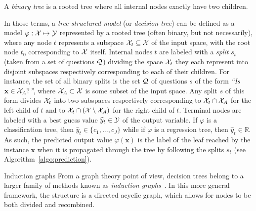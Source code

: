\begin{definition}
A \emph{binary tree} is a rooted tree where all internal nodes exactly
have two children.
\end{definition}

In those terms, a \textit{tree-structured model} (or \textit{decision tree})
can be defined as a model $\varphi: {\cal X} \mapsto {\cal Y}$ represented by a
rooted tree (often binary, but not necessarily), where any node $t$ represents
a subspace ${\cal X}_t \subseteq {\cal X}$ of the input space, with the root
node $t_0$ corresponding to ${\cal X}$ itself. Internal nodes $t$ are labeled with a
\textit{split} $s_t$ (taken from a set of questions ${\cal Q}$) dividing the
space ${\cal X}_t$ they each represent into disjoint subspaces respectively
corresponding to each of their children. For instance, the set of all binary
splits is the set ${\cal Q}$ of questions $s$ of the form \textit{``Is
$\mathbf{x} \in {\cal X}_A?$''}, where ${\cal X}_A \subset {\cal X}$ is some
subset of the input space. Any split $s$ of this form divides ${\cal X}_t$ into
two subspaces respectively corresponding to ${\cal X}_t \cap {\cal X}_A$ for
the left child of $t$ and to ${\cal X}_t \cap ({\cal X}\setminus{\cal X}_A)$
for the right child of $t$. Terminal nodes are labeled with a best guess value
$\widehat{y}_t \in {\cal Y}$ of the output variable. If $\varphi$ is a
classification tree, then $\widehat{y}_t \in \{ c_1, ..., c_J \}$ while if
$\varphi$ is a regression tree, then $\widehat{y}_t \in \mathbb{R}$. As such,
the predicted output value $\varphi(\mathbf{x})$
is the label of the leaf reached by the instance $\mathbf{x}$ when it is propagated through
the tree by following the splits $s_t$ (see Algorithm~\ref{algo:prediction}).


\begin{remark}{Induction graphs}
From a graph theory point of view, decision trees belong to a larger family
of methods known as \textit{induction graphs}~\citep{zighed:2000}. In this more
general framework, the structure is a directed acyclic graph, which allows for
nodes to be both divided and recombined.
\end{remark}

